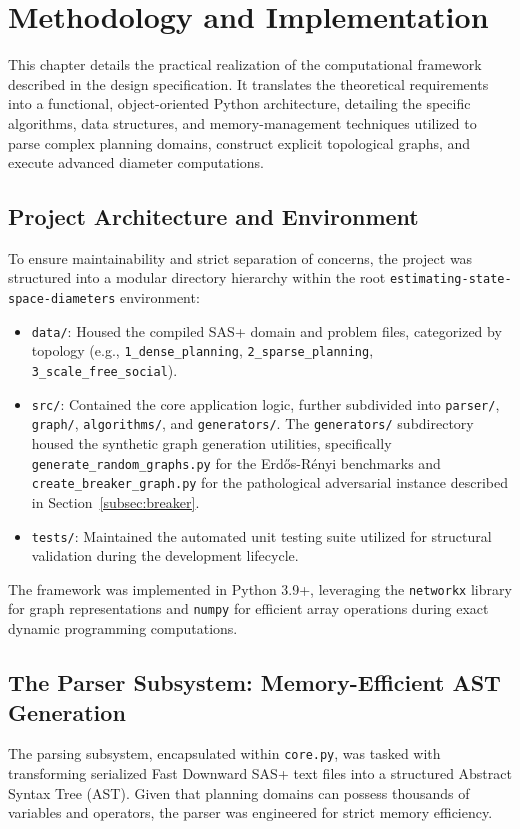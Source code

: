 \chapter{Methodology and Implementation}

This chapter details the practical realization of the computational framework described in the design specification. It translates the theoretical requirements into a functional, object-oriented Python architecture, detailing the specific algorithms, data structures, and memory-management techniques utilized to parse complex planning domains, construct explicit topological graphs, and execute advanced diameter computations.

\section{Project Architecture and Environment}
To ensure maintainability and strict separation of concerns, the project was structured into a modular directory hierarchy within the root \texttt{estimating-state-space-diameters} environment:
\begin{itemize}
    \item \texttt{data/}: Housed the compiled SAS+ domain and problem files, categorized by topology (e.g., \texttt{1\_dense\_planning}, \texttt{2\_sparse\_planning}, \texttt{3\_scale\_free\_social}).
    \item \texttt{src/}: Contained the core application logic, further subdivided into \texttt{parser/}, \texttt{graph/}, \texttt{algorithms/}, and \texttt{generators/}. The \texttt{generators/} subdirectory housed the synthetic graph generation utilities, specifically \texttt{generate\_random\_graphs.py} for the Erdős-Rényi benchmarks and \texttt{create\_breaker\_graph.py} for the pathological adversarial instance described in Section~\ref{subsec:breaker}.
    \item \texttt{tests/}: Maintained the automated unit testing suite utilized for structural validation during the development lifecycle.
\end{itemize}
The framework was implemented in Python 3.9+, leveraging the \texttt{networkx} library for graph representations and \texttt{numpy} for efficient array operations during exact dynamic programming computations.

\section{The Parser Subsystem: Memory-Efficient AST Generation}
The parsing subsystem, encapsulated within \texttt{core.py}, was tasked with transforming serialized Fast Downward SAS+ text files into a structured Abstract Syntax Tree (AST). Given that planning domains can possess thousands of variables and operators, the parser was engineered for strict memory efficiency.

